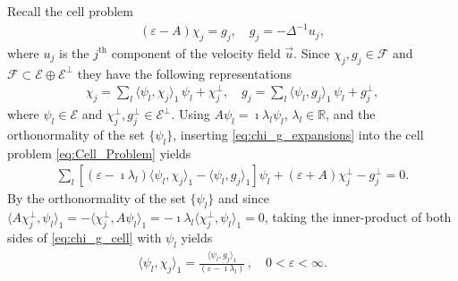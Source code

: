 \documentclass{article}
\newcommand{\Fc}{\mathcal{F}}
\newcommand{\Ec}{\mathcal{E}}
\newcommand{\0}{\mathbf{0}}
\newcommand{\1}{\mathbf{1}}
\newcommand{\2}{\mathbf{2}}
\newcommand{\3}{\mathbf{3}}
\newcommand{\4}{\mathbf{4}}
\newcommand{\5}{\mathbf{5}}
\newcommand{\6}{\mathbf{6}}
\newcommand{\7}{\mathbf{7}}
\newcommand{\8}{\mathbf{8}}
\begin{document}
Recall the cell problem
% 
\begin{align}\label{eq:Cell_Problem}
  (\varepsilon-A)\chi_j=g_j, \quad g_j=-\Delta^{-1}u_j,
\end{align}
%
where $u_j$ is the $j^{\text{th}}$ component of the velocity field
$\vec{u}$. Since $\chi_j,g_j\in\Fc$ and $\Fc\subset\Ec\oplus\Ec^\perp$ they have the
following representations 
%
\begin{align}\label{eq:chi_g_expansions}
  \chi_j=\sum_l\langle\psi_l,\chi_j\rangle_1\,\psi_l +\chi_j^\perp, \quad  g_j=\sum_l\langle\psi_l,g_j\rangle_1\,\psi_l +g_j^\perp,
\end{align}
%
where $\psi_l\in\Ec$ and $\chi_j^\perp,g_j^\perp\in\Ec^\perp$. Using $A\psi_l=\imath\lambda_l\psi_l$,
$\lambda_l\in\mathbb{R}$, and the orthonormality of the set $\{\psi_l\}$, inserting 
\eqref{eq:chi_g_expansions} into the cell problem
\eqref{eq:Cell_Problem} yields
%
\begin{align}\label{eq:chi_g_cell}
  \sum_l[(\varepsilon-\imath\lambda_l)\langle\psi_l,\chi_j\rangle_1-\langle\psi_l,g_j\rangle_1]\psi_l+(\varepsilon+A)\chi_j^\perp-g_j^\perp=0.
\end{align}
%
By the orthonormality of the set $\{\psi_l\}$ and since
$\langle A\chi_j^\perp,\psi_l\rangle_1=-\langle\chi_j^\perp,A\psi_l\rangle_1=-\imath\lambda_l\langle\chi_j^\perp,\psi_l\rangle_1=0$, taking the
inner-product of both sides of \eqref{eq:chi_g_cell} with $\psi_l$ yields 
%
\begin{align}\label{eq:Coefficients}
  \langle\psi_l,\chi_j\rangle_1=\frac{\langle\psi_l,g_j\rangle_1}{(\varepsilon-\imath\lambda_l)}\,, \quad
  0<\varepsilon<\infty.
\end{align}
%
\end{document}

